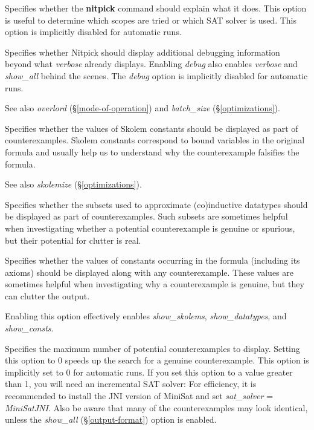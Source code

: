 \documentclass[a4paper,12pt]{article}
\begin{document}
\begin{enum}
Specifies whether the \textbf{nitpick} command should explain what it does. This
option is useful to determine which scopes are tried or which SAT solver is
used. This option is implicitly disabled for automatic runs.

Specifies whether Nitpick should display additional debugging information beyond
what \textit{verbose} already displays. Enabling \textit{debug} also enables
\textit{verbose} and \textit{show\_all} behind the scenes. The \textit{debug}
option is implicitly disabled for automatic runs.

\nopagebreak
{\small See also \textit{overlord} (\S\ref{mode-of-operation}) and
\textit{batch\_size} (\S\ref{optimizations}).}

Specifies whether the values of Skolem constants should be displayed as part of
counterexamples. Skolem constants correspond to bound variables in the original
formula and usually help us to understand why the counterexample falsifies the
formula.

\nopagebreak
{\small See also \textit{skolemize} (\S\ref{optimizations}).}

Specifies whether the subsets used to approximate (co)in\-duc\-tive datatypes should
be displayed as part of counterexamples. Such subsets are sometimes helpful when
investigating whether a potential counterexample is genuine or spurious, but
their potential for clutter is real.

Specifies whether the values of constants occurring in the formula (including
its axioms) should be displayed along with any counterexample. These values are
sometimes helpful when investigating why a counterexample is
genuine, but they can clutter the output.

Enabling this option effectively enables \textit{show\_skolems},
\textit{show\_datatypes}, and \textit{show\_consts}.

Specifies the maximum number of potential counterexamples to display. Setting
this option to 0 speeds up the search for a genuine counterexample. This option
is implicitly set to 0 for automatic runs. If you set this option to a value
greater than 1, you will need an incremental SAT solver: For efficiency, it is
recommended to install the JNI version of MiniSat and set \textit{sat\_solver} =
\textit{MiniSatJNI}. Also be aware that many of the counterexamples may look
identical, unless the \textit{show\_all} (\S\ref{output-format}) option is
enabled.


\end{enum}
\end{document}
